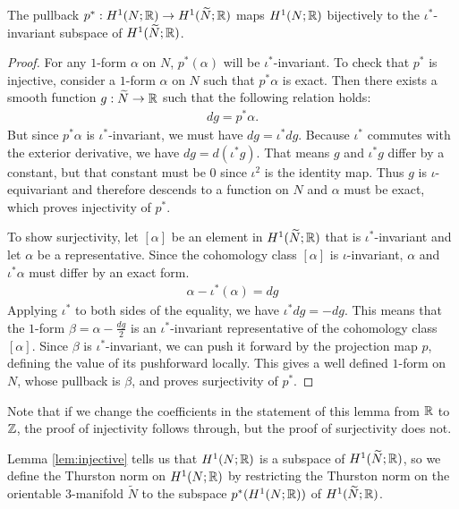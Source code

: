 \begin{lem}
  \label{lem:injective}
  The pullback $p^{\ast}:H^1(N;\mathbb{R})\rightarrow H^1(\widetilde{N};\mathbb{R})$ maps $H^1(N; \mathbb{R})$ bijectively to the $\iota^{\ast}$-invariant subspace of   $H^1(\widetilde{N}; \mathbb{R})$.
\end{lem}
\begin{proof}
  For any $1$-form $\alpha$ on $N$, $p^{\ast}(\alpha)$ will be $\iota^{\ast}$-invariant.
  To check that $p^\ast$ is injective, consider a $1$-form $\alpha$ on $N$ such that $p^{\ast}\alpha$ is exact.
  Then there exists a smooth function $g:\widetilde{N} \to \mathbb{R}$ such that the following relation holds:
    \begin{align*}
        dg = p^{\ast} \alpha.
    \end{align*}
    But since $p^{\ast}\alpha$ is $\iota^{\ast}$-invariant, we must have $dg = \iota^{\ast} dg$.
    Because $\iota^\ast$ commutes with the exterior derivative, we have $dg = d(\iota^{\ast}g)$.
    That means $g$ and $\iota^{\ast}g$ differ by a constant, but that constant must be $0$ since $\iota^2$ is the identity map.
    Thus $g$ is $\iota$-equivariant and therefore descends to a function on $N$ and $\alpha$ must be exact, which proves injectivity of $p^{\ast}$.

    To show surjectivity, let $[\alpha]$ be an element in $H^1(\widetilde{N}; \mathbb{R})$ that is $\iota^{\ast}$-invariant and let $\alpha$ be a representative.
    Since the cohomology class $[\alpha]$ is $\iota$-invariant, $\alpha$ and $\iota^{\ast}\alpha$ must differ by an exact form.
    \begin{align*}
        \alpha - \iota^{\ast}(\alpha) = dg
    \end{align*}
    Applying $\iota^\ast$ to both sides of the equality, we have $\iota^{\ast}dg = -dg$.
    This means that the $1$-form $\beta = \alpha - \frac{dg}{2}$ is an $\iota^{\ast}$-invariant representative of the cohomology class $[\alpha]$.
    Since $\beta$ is $\iota^{\ast}$-invariant, we can push it forward by the projection map $p$, defining the value of its pushforward locally.
    This gives a well defined $1$-form on $N$, whose pullback is $\beta$, and proves surjectivity of $p^{\ast}$.
\end{proof}
\begin{rem}
  Note that if we change the coefficients in the statement of this lemma from $\mathbb{R}$ to $\mathbb{Z}$, the proof of injectivity follows through, but the proof of surjectivity does not.
\end{rem}

Lemma \ref{lem:injective} tells us that $H^1(N; \mathbb{R})$ is a subspace of $H^1(\widetilde{N}; \mathbb{R})$, so we define the Thurston norm on $H^1(N; \mathbb{R})$ by restricting the Thurston norm on the orientable 3-manifold $\widetilde{N}$ to the subspace $p^*(H^1(N;\mathbb{R}))$ of $H^1(\widetilde{N};\mathbb{R})$.

